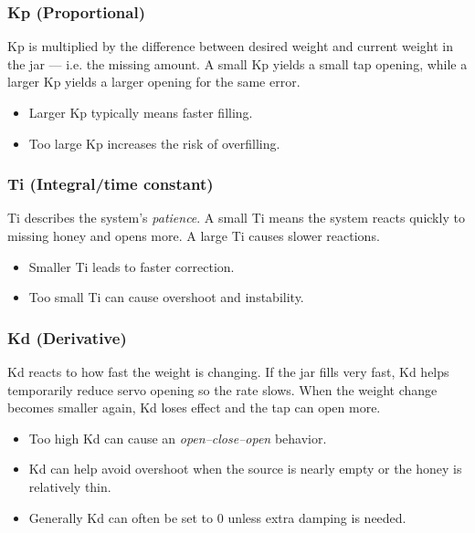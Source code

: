 \documentclass[11pt,a4paper]{article}
\begin{document}
\subsubsection*{Kp (Proportional)}

Kp is multiplied by the difference between desired weight and current weight in the jar — i.e. the missing amount. A small Kp yields a small tap opening, while a larger Kp yields a larger opening for the same error.

\begin{itemize}[leftmargin=*]
    \item Larger Kp typically means faster filling.
    \item Too large Kp increases the risk of overfilling.
\end{itemize}

\subsubsection*{Ti (Integral/time constant)}

Ti describes the system's \textit{patience}. A small Ti means the system reacts quickly to missing honey and opens more. A large Ti causes slower reactions.

\begin{itemize}[leftmargin=*]
    \item Smaller Ti leads to faster correction.
    \item Too small Ti can cause overshoot and instability.
\end{itemize}

\subsubsection*{Kd (Derivative)}

Kd reacts to how fast the weight is changing. If the jar fills very fast, Kd helps temporarily reduce servo opening so the rate slows. When the weight change becomes smaller again, Kd loses effect and the tap can open more.

\begin{itemize}[leftmargin=*]
    \item Too high Kd can cause an \textit{open–close–open} behavior.
    \item Kd can help avoid overshoot when the source is nearly empty or the honey is relatively thin.
    \item Generally Kd can often be set to 0 unless extra damping is needed.
\end{itemize}
\end{document}
